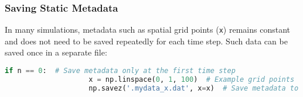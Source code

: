 \documentclass{article}
\begin{document}
			\begin{comment}
		
			\paragraph{Why Use \texttt{**kwargs} Here?}
			In the context of saving arrays:
			\begin{itemize}
				\item Simulations often produce arrays dynamically at each time step.
				\item These arrays need meaningful, dynamic names (e.g., \texttt{'u0011'}, \texttt{'v0011'}) for better organization.
			\end{itemize}
			
			Manually specifying these names and arrays for \texttt{numpy.savez} at every step would be tedious and error-prone:
			\begin{lstlisting}[language=Python]
				np.savez(fname, u0011=u, v0011=v)  # Manual and inflexible
			\end{lstlisting}
			
			Instead, using a dictionary and the \texttt{**kwargs} operator simplifies the process:
			\begin{lstlisting}[language=Python]
				kwargs = {'u0011': u, 'v0011': v}
				np.savez(fname, **kwargs)  # Dynamic and flexible
			\end{lstlisting}
			
			This approach automates the association of array names and values, making the code cleaner, more concise, and adaptable to changes, such as adding more arrays to the simulation.
			
				content...
			\end{comment}
			
			\subsubsection{Saving Static Metadata}
			
			In many simulations, metadata such as spatial grid points (\texttt{x}) remains constant and does not need to be saved repeatedly for each time step. Such data can be saved once in a separate file:
			\begin{lstlisting}[language=Python]
				if n == 0:  # Save metadata only at the first time step
					x = np.linspace(0, 1, 100)  # Example grid points
					np.savez('.mydata_x.dat', x=x)  # Save metadata to a separate file
			\end{lstlisting}
			
\end{document}

